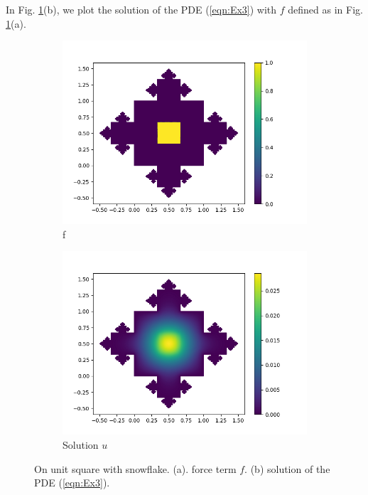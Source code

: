 \documentclass[12pt]{article}%
\theoremstyle{plain}
\numberwithin{equation}{section}
\begin{document}
 In Fig. \ref{Ex3_solution}(b), we plot the solution of the PDE (\ref{eqn:Ex3}) with $f$ defined as in  Fig. \ref{Ex3_solution}(a). 
  \begin{figure}[H]%
    \centering
         \begin{subfigure}[h]{0.45\linewidth}
         \caption{f}
\includegraphics[width=\linewidth]{figures/Ex3/Ex3_f.png}
\end{subfigure}
 \begin{subfigure}[h]{0.45\linewidth}
         \caption{Solution $u$}
\includegraphics[width=\linewidth]{figures/Ex3/Ex3_solution.png}
\end{subfigure}
  \caption{On unit square with snowflake. (a). force term $f$. (b) solution of the PDE (\ref{eqn:Ex3}). }
  \label{Ex3_solution}
 \end{figure}
 
\end{document}
